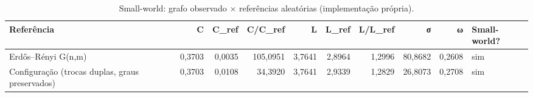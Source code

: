 \begin{table}[ht]
\centering
\caption{Small-world: grafo observado × referências aleatórias (implementação própria).}
\label{tab:smallworld}
\small
\begin{tabular}{lrrrrrrrrl}
\hline
Referência & C & C\_ref & C/C\_ref & L & L\_ref & L/L\_ref & σ & ω & Small-world? \\
\hline
Erdős–Rényi G(n,m) & 0,3703 & 0,0035 & 105,0951 & 3,7641 & 2,8964 & 1,2996 & 80,8682 & 0,2608 & sim \\
Configuração (trocas duplas, graus preservados) & 0,3703 & 0,0108 & 34,3920 & 3,7641 & 2,9339 & 1,2829 & 26,8073 & 0,2708 & sim \\
\hline
\end{tabular}
\end{table}
